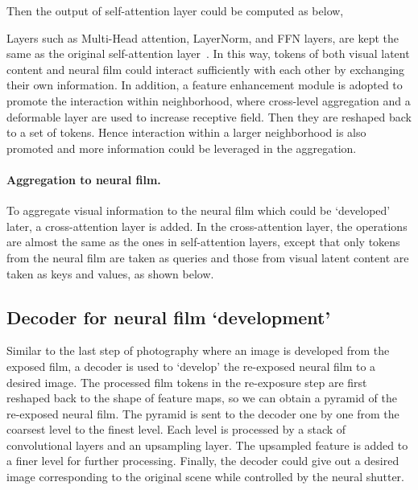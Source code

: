 \documentclass[10pt,twocolumn,letterpaper]{article}
\begin{document}
Then the output of self-attention layer could be computed as below,

Layers such as Multi-Head attention, LayerNorm, and FFN layers, are kept the same as the original self-attention layer~\cite{Transformer}.
In this way, tokens of both visual latent content and neural film could interact sufficiently with each other by exchanging their own information.
In addition, a feature enhancement module is adopted to promote the interaction within neighborhood, where cross-level aggregation and a deformable layer\cite{DCN} are used to increase receptive field. Then they are reshaped back to a set of tokens. Hence interaction within a larger neighborhood is also promoted and more information could be leveraged in the aggregation.

\paragraph{Aggregation to neural film.} 
To aggregate visual information to the neural film which could be `developed' later, a cross-attention layer is added.
In the cross-attention layer, the operations are almost the same as the ones in self-attention layers, except that only tokens from the neural film are taken as queries and those from visual latent content are taken as keys and values, as shown below.



\subsection{Decoder for neural film `development'}
\label{sec:Decoder}
Similar to the last step of photography where an image is developed from the exposed film,
a decoder is used to `develop' the re-exposed neural film to a desired image.
The processed film tokens in the re-exposure step are first reshaped back to the shape of feature maps, so we can obtain a pyramid of the re-exposed neural film.
The pyramid is sent to the decoder one by one from the coarsest level to the finest level.
Each level is processed by a stack of convolutional layers and an upsampling layer. 
The upsampled feature is added to a finer level for further processing.
Finally, the decoder could give out a desired image corresponding to the original scene while controlled by the neural shutter.
\end{document}

